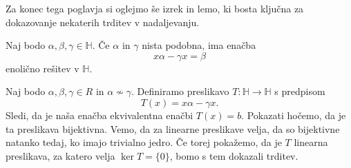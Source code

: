 \documentclass[mat1, tisk]{fmfdelo}
\numberwithin{equation}{section}
\begin{document}
Za konec tega poglavja si oglejmo še izrek in lemo, ki bosta ključna za dokazovanje nekaterih trditev v nadaljevanju. 

\begin{izrek}\label{enacba}
    Naj bodo $\alpha, \beta, \gamma \in \mathbb{H}$. Če $\alpha$ in $\gamma$ nista podobna, ima enačba
    $$x\alpha - \gamma x = \beta$$
    enolično rešitev v $\mathbb{H}$.
\end{izrek}

\begin{dokaz}
    Naj bodo $\alpha, \beta, \gamma \in R$ in $\alpha \nsim \gamma$. Definiramo preslikavo $T: \mathbb{H} \rightarrow 
    \mathbb{H}$ s predpisom
    $$T(x) = x\alpha - \gamma x.$$
    Sledi, da je naša enačba ekvivalentna enačbi
    $T(x) = b$.
    Pokazati hočemo, da je ta preslikava bijektivna. Vemo, da za linearne preslikave velja, da so bijektivne natanko
    tedaj, ko imajo trivialno jedro. Če torej pokažemo, da je $T$ linearna preslikava, za katero velja $\ker T = \{0\}$,
    bomo s tem dokazali trditev. 
    

\end{dokaz}
\end{document}
